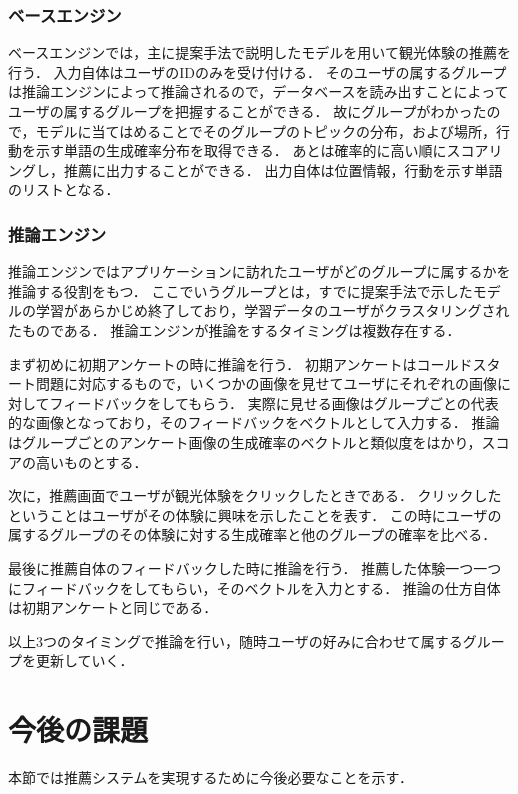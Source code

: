 \documentclass[a4j,10pt, twocolumn]{jarticle}
\begin{document}
\subsubsection{ベースエンジン}
ベースエンジンでは，主に提案手法で説明したモデルを用いて観光体験の推薦を行う．
入力自体はユーザのIDのみを受け付ける．
そのユーザの属するグループは推論エンジンによって推論されるので，データベースを読み出すことによってユーザの属するグループを把握することができる．
故にグループがわかったので，モデルに当てはめることでそのグループのトピックの分布，および場所，行動を示す単語の生成確率分布を取得できる．
あとは確率的に高い順にスコアリングし，推薦に出力することができる．
出力自体は位置情報，行動を示す単語のリストとなる．

\subsubsection{推論エンジン}
推論エンジンではアプリケーションに訪れたユーザがどのグループに属するかを推論する役割をもつ．
ここでいうグループとは，すでに提案手法で示したモデルの学習があらかじめ終了しており，学習データのユーザがクラスタリングされたものである．
推論エンジンが推論をするタイミングは複数存在する．

まず初めに初期アンケートの時に推論を行う．
初期アンケートはコールドスタート問題に対応するもので，いくつかの画像を見せてユーザにそれぞれの画像に対してフィードバックをしてもらう．
実際に見せる画像はグループごとの代表的な画像となっており，そのフィードバックをベクトルとして入力する．
推論はグループごとのアンケート画像の生成確率のベクトルと類似度をはかり，スコアの高いものとする．

次に，推薦画面でユーザが観光体験をクリックしたときである．
クリックしたということはユーザがその体験に興味を示したことを表す．
この時にユーザの属するグループのその体験に対する生成確率と他のグループの確率を比べる．

最後に推薦自体のフィードバックした時に推論を行う．
推薦した体験一つ一つにフィードバックをしてもらい，そのベクトルを入力とする．
推論の仕方自体は初期アンケートと同じである．

以上3つのタイミングで推論を行い，随時ユーザの好みに合わせて属するグループを更新していく．


\section{今後の課題} \label{future_work}
本節では推薦システムを実現するために今後必要なことを示す．
\end{document}
